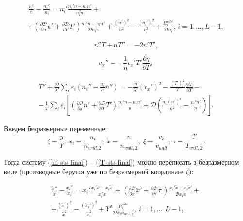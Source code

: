 \documentclass[12pt]{article}
\begin{document}
\begin{multline}
\frac{n''}{n} - \frac{n_{i}''}{n_{i}} = 
  n_{i}' \frac{n_{i}'n - n_{i}n'}{n_{i}^2 n} + \\
  + \left(\frac{\partial \mathcal{D}}{\partial n}n' + \frac{\partial \mathcal{D}}{\partial T}T' \right) \frac{n_{i}'n - n_{i}n'}{\mathcal{D}n_{i}n} + \frac{\left(n'\right)^2}{n^2} - \frac{\left(n_{i}'\right)^2}{n_{i}^2} + \frac{R_{i}^{vibr}}{\mathcal{D}n_{i}},\:i=1,\ldots,L-1,\label{ni-sts-final}
\end{multline}

\begin{equation}
  n''T + nT'' = -2n'T',
\end{equation}

\begin{equation}
  v_{x}'' = -\frac{1}{\eta} v_{x}' T' \frac{\partial \eta}{\partial T},
\end{equation}

\begin{multline}
  T'' + \frac{\mathcal{D}}{\lambda'}\sum_{i}\varepsilon_{i}\left(n_{i}'' - \frac{n_{i}}{n}n'' \right) = -\frac{\eta}{\lambda'} \left(v_{x}' \right)^2 - \frac{\left(T'\right)^2}{\lambda'} \frac{\partial \lambda'}{\partial T} - \\
  - \frac{1}{\lambda'}\sum_{i}\varepsilon_{i} \left[\left(\frac{\partial \mathcal{D}}{\partial n}n' + \frac{\partial \mathcal{D}}{\partial T}T' \right) \frac{n_{i}'n - n_{i}n'}{n} + \mathcal{D}\left(\frac{n_{i}\left(n'\right)^2}{n^2} - \frac{n_{i}'n'}{n} \right)  \right].\label{T-sts-final}
\end{multline}

Введем безразмерные переменные:
\begin{equation}
  \zeta = \frac{y}{Y},\:x_{i} = \frac{n_{i}}{n_{wall,2}},\:\tilde{x}=\frac{n}{n_{wall,2}},\:\xi=\frac{v_{x}}{v_{wall}},\:\tau=\frac{T}{T_{wall,2}}.
\end{equation}

Тогда систему (\ref{ni-sts-final}) -- (\ref{T-sts-final}) можно переписать в безразмерном виде (производные берутся уже по безразмерной координате $\zeta$):

\begin{multline}
\frac{\tilde{x}''}{\tilde{x}} - \frac{x_{i}''}{x_{i}} = 
  x_{i}' \frac{x_{i}'\tilde{x} - x_{i}\tilde{x}'}{x_{i}^2 \tilde{x}} + \left(\frac{\partial \mathcal{D}}{\partial \tilde{x}}\tilde{x}' + \frac{\partial \mathcal{D}}{\partial \tau}\tau' \right) \frac{x_{i}'\tilde{x} - x_{i}\tilde{x}'}{\mathcal{D}x_{i}\tilde{x}} + \\
  + \frac{\left(\tilde{x}'\right)^2}{\tilde{x}^2} - \frac{\left(\tilde{x}_{i}'\right)^2}{\tilde{x}_{i}^2} + Y^{2}\frac{R_{i}^{vibr}}{\mathcal{D}x_{i}n_{wall,2}},\:i=1,\ldots,L-1,\label{ni-sts-final-dimless}
\end{multline}
\end{document}
